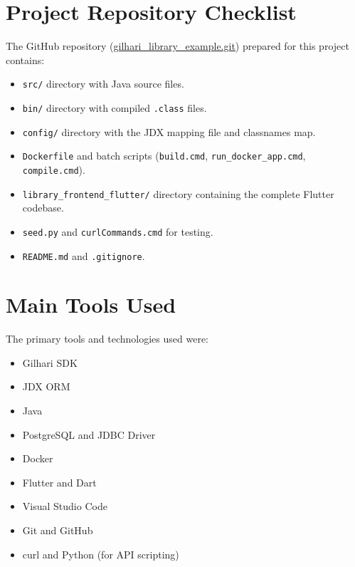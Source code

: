 \documentclass{book}
\begin{document}


\begin{appendices}
\chapter{Project Repository Checklist}
The GitHub repository (\href{https://github.com/sudhanva-bh/gilhari_library_example.git}{gilhari\_library\_example.git}) prepared for this project contains:
\begin{itemize}
\item \texttt{src/} directory with Java source files.
\item \texttt{bin/} directory with compiled \texttt{.class} files.
\item \texttt{config/} directory with the JDX mapping file and classnames map.
\item \texttt{Dockerfile} and batch scripts (\texttt{build.cmd}, \texttt{run\_docker\_app.cmd}, \texttt{compile.cmd}).
\item \texttt{library\_frontend\_flutter/} directory containing the complete Flutter codebase.
\item \texttt{seed.py} and \texttt{curlCommands.cmd} for testing.
\item \texttt{README.md} and \texttt{.gitignore}.
\end{itemize}

\chapter{Main Tools Used}
The primary tools and technologies used were:
\begin{itemize}
\item Gilhari SDK
\item JDX ORM
\item Java
\item PostgreSQL and JDBC Driver
\item Docker
\item Flutter and Dart
\item Visual Studio Code
\item Git and GitHub
\item curl and Python (for API scripting)
\end{itemize}

\end{appendices}
\end{document}

